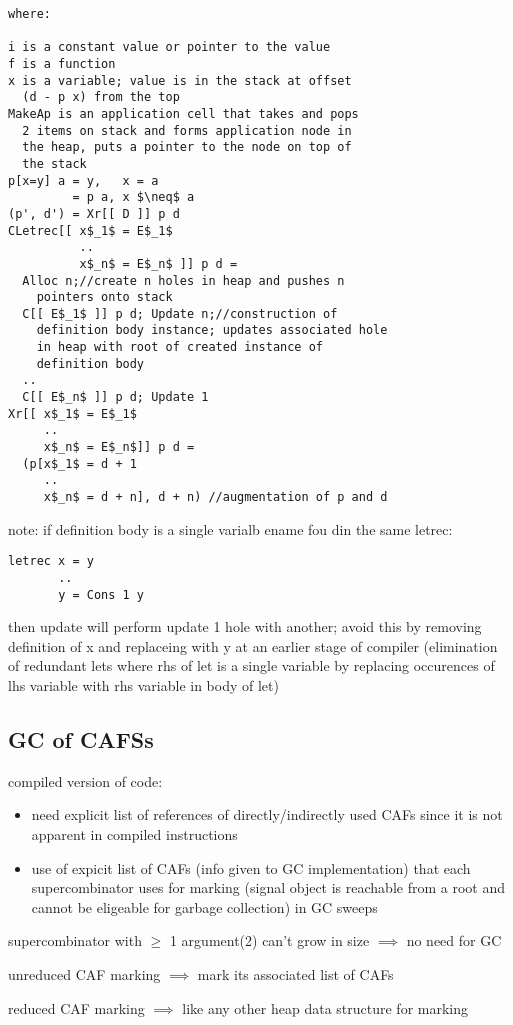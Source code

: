 \documentclass[8pt]{extarticle}
\begin{document}
\begin{multicols*}{2}
\begin{lstlisting}
where:

i is a constant value or pointer to the value
f is a function
x is a variable; value is in the stack at offset
  (d - p x) from the top
MakeAp is an application cell that takes and pops
  2 items on stack and forms application node in
  the heap, puts a pointer to the node on top of
  the stack
p[x=y] a = y,   x = a
         = p a, x $\neq$ a
(p', d') = Xr[[ D ]] p d
CLetrec[[ x$_1$ = E$_1$
          ..
          x$_n$ = E$_n$ ]] p d =
  Alloc n;//create n holes in heap and pushes n
    pointers onto stack
  C[[ E$_1$ ]] p d; Update n;//construction of
    definition body instance; updates associated hole
    in heap with root of created instance of
    definition body
  ..
  C[[ E$_n$ ]] p d; Update 1
Xr[[ x$_1$ = E$_1$
     ..
     x$_n$ = E$_n$]] p d =
  (p[x$_1$ = d + 1
     ..
     x$_n$ = d + n], d + n) //augmentation of p and d
\end{lstlisting}

note: if definition body is a single varialb ename fou din the same letrec:
\begin{lstlisting}
letrec x = y
       ..
       y = Cons 1 y
\end{lstlisting}
then update will perform update 1 hole with another; avoid this by removing definition of x and replaceing with y at an earlier stage of compiler (elimination of  redundant lets where rhs of let is a single variable by replacing occurences of lhs variable with rhs variable in body of let)

\subsection{GC of CAFSs}
compiled version of code:
\begin{itemize}
\item need explicit list of references of directly/indirectly used CAFs since it is not apparent in compiled instructions
\item use of expicit list of CAFs (info given to GC implementation) that each supercombinator uses for marking (signal object is reachable from a root and cannot be eligeable for garbage collection) in GC sweeps
\end{itemize}

supercombinator with $\geq$ 1 argument(2) can't grow in size $\implies$ no need for GC

unreduced CAF marking $\implies$ mark its associated list of CAFs

reduced CAF marking $\implies$ like any other heap data structure for marking


\end{multicols*}
\end{document}
